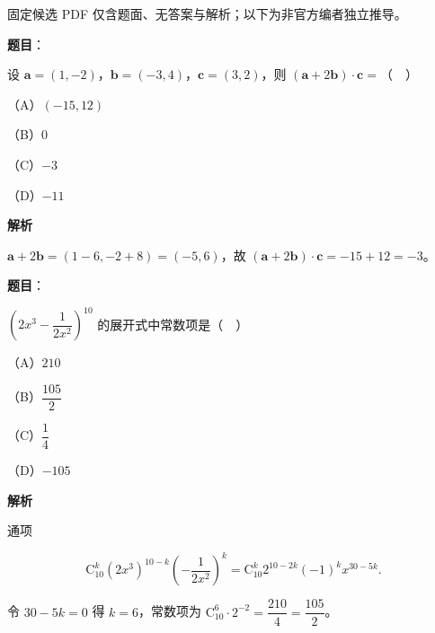 

\begin{gktip}
固定候选 PDF 仅含题面、无答案与解析；以下为非官方编者独立推导。
\end{gktip}

\begin{answer}

\textbf{题目}：

设 $\boldsymbol a=(1,-2)$，$\boldsymbol b=(-3,4)$，$\boldsymbol c=(3,2)$，则 $(\boldsymbol a+2\boldsymbol b)\cdot\boldsymbol c=$（　）

（A）$(-15,12)$

（B）$0$

（C）$-3$

（D）$-11$

\textbf{解析}

$\boldsymbol a+2\boldsymbol b=(1-6,-2+8)=(-5,6)$，故 $(\boldsymbol a+2\boldsymbol b)\cdot\boldsymbol c=-15+12=-3$。


\end{answer}
\begin{answer}

\textbf{题目}：

$\left(2x^3-\dfrac1{2x^2}\right)^{10}$ 的展开式中常数项是（　）

（A）$210$

（B）$\dfrac{105}2$

（C）$\dfrac14$

（D）$-105$

\textbf{解析}

通项

\nopagebreak[4]
\[\mathrm C_{10}^k(2x^3)^{10-k}\left(-\frac1{2x^2}\right)^k=\mathrm C_{10}^k2^{10-2k}(-1)^kx^{30-5k}.\]

令 $30-5k=0$ 得 $k=6$，常数项为 $\mathrm C_{10}^6\cdot2^{-2}=\dfrac{210}4=\dfrac{105}2$。


\end{answer}
